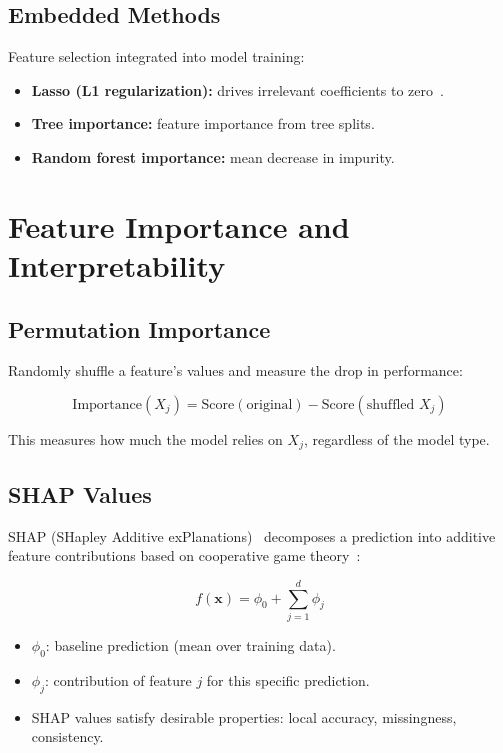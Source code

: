 \subsection{Embedded Methods}

Feature selection integrated into model training:

\begin{itemize}
	\item \textbf{Lasso (L1 regularization):} drives irrelevant coefficients to zero~\cite{tibshirani1996regression}.
	\item \textbf{Tree importance:} feature importance from tree splits.
	\item \textbf{Random forest importance:} mean decrease in impurity.
\end{itemize}

\section{Feature Importance and Interpretability}

\subsection{Permutation Importance}

Randomly shuffle a feature's values and measure the drop in performance:

\[
	\text{Importance}(X_j) = \text{Score}(\text{original}) - \text{Score}(\text{shuffled } X_j)
\]

This measures how much the model relies on $X_j$, regardless of the model type.

\subsection{SHAP Values}

SHAP (SHapley Additive exPlanations)~\cite{lundberg2017unified} decomposes a prediction into additive feature contributions based on cooperative game theory~\cite{shapley1953value}:

\[
	f(\mathbf{x}) = \phi_0 + \sum_{j=1}^d \phi_j
\]

\begin{itemize}
	\item $\phi_0$: baseline prediction (mean over training data).
	\item $\phi_j$: contribution of feature $j$ for this specific prediction.
	\item SHAP values satisfy desirable properties: local accuracy, missingness, consistency.
\end{itemize}

